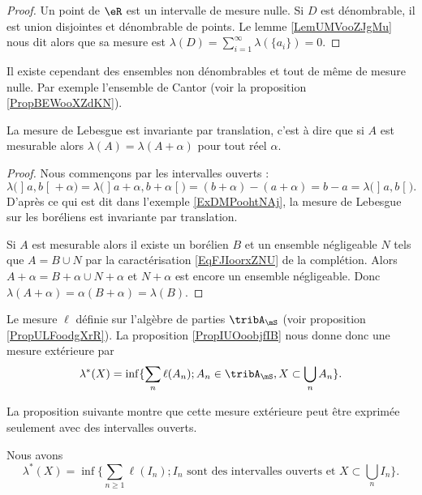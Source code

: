 \begin{proof}
    Un point de \( \eR\) est un intervalle de mesure nulle. Si \( D\) est dénombrable, il est union disjointes et dénombrable de points. Le lemme \ref{LemUMVooZJgMu} nous dit alors que sa mesure est \( \lambda(D)=\sum_{i=1}^{\infty}\lambda(\{ a_i \})=0\).
\end{proof}

\begin{remark}
    Il existe cependant des ensembles non dénombrables et tout de même de mesure nulle. Par exemple l'ensemble de Cantor (voir la proposition \ref{PropBEWooXZdKN}).
\end{remark}


\begin{proposition}     \label{PropooOACLooLMIUuY}
    La mesure de Lebesgue est invariante par translation, c'est à dire que si \( A\) est mesurable alors \( \lambda(A)=\lambda(A+\alpha)\) pour tout réel \( \alpha\).
\end{proposition}

\begin{proof}
    Nous commençons par les intervalles ouverts :
    \begin{equation}
    \lambda\big( \mathopen] a , b \mathclose[+\alpha \big)=\lambda\big( \mathopen] a+\alpha , b+\alpha \mathclose[ \big)=(b+\alpha)-(a+\alpha)=b-a=\lambda\big( \mathopen] a , b \mathclose[ \big).
    \end{equation}
    D'après ce qui est dit dans l'exemple \ref{ExDMPoohtNAj}, la mesure de Lebesgue sur les boréliens est invariante par translation.

    Si \( A\) est mesurable alors il existe un borélien \( B\) et un ensemble négligeable \( N\) tels que \( A=B\cup N\) par la caractérisation \ref{EqFJIoorxZNU} de la complétion. Alors \( A+\alpha=B+\alpha\cup N+\alpha\) et \( N+\alpha\) est encore un ensemble négligeable. Donc \( \lambda(A+\alpha)=\alpha(B+\alpha)=\lambda(B)\).
\end{proof}

Le mesure \( \ell\) définie sur l'algèbre de parties \( \tribA_{\mS}\) (voir proposition \ref{PropULFoodgXrR}). La proposition \ref{PropIUOoobjfIB} nous donne donc une mesure extérieure par
\begin{equation}    \label{EqJGXoogdKqb}
    \lambda^*(X)=\inf\{ \sum_n\ell(A_n);A_n\in\tribA_{\mS},X\subset\bigcup_nA_n \}.
\end{equation}

La proposition suivante montre que cette mesure extérieure peut être exprimée seulement avec des intervalles ouverts.
\begin{proposition} \label{PropTNOooDcfwn}
    Nous avons
    \begin{equation}
        \lambda^*(X)=\inf\{ \sum_{n\geq 1}\ell(I_n); I_n\text{ sont des intervalles ouverts et }X\subset\bigcup_nI_n \}.
    \end{equation}
\end{proposition}

